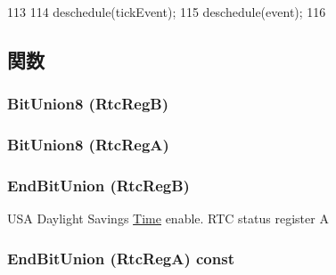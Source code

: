 \begin{DoxyCode}
113 {
114     deschedule(tickEvent);
115     deschedule(event);
116 }
\end{DoxyCode}


\subsection{関数}
\hypertarget{classMC146818_ae9e7ebb8d4dc55d588540f5b369c2bbd}{
\subsubsection[{BitUnion8}]{\setlength{\rightskip}{0pt plus 5cm}BitUnion8 (RtcRegB)}}
\label{classMC146818_ae9e7ebb8d4dc55d588540f5b369c2bbd}
\hypertarget{classMC146818_a374ca70b66d8c7697052fbf0d917c31c}{
\subsubsection[{BitUnion8}]{\setlength{\rightskip}{0pt plus 5cm}BitUnion8 (RtcRegA)}}
\label{classMC146818_a374ca70b66d8c7697052fbf0d917c31c}
\hypertarget{classMC146818_a7efacf2a80b3519649bf9901abe5eaae}{
\subsubsection[{EndBitUnion}]{\setlength{\rightskip}{0pt plus 5cm}EndBitUnion (RtcRegB)}}
\label{classMC146818_a7efacf2a80b3519649bf9901abe5eaae}


USA Daylight Savings \hyperlink{classTime}{Time} enable. RTC status register A \hypertarget{classMC146818_ae44f0fd1a86e3e746e818f5817c33e18}{
\subsubsection[{EndBitUnion}]{\setlength{\rightskip}{0pt plus 5cm}EndBitUnion (RtcRegA) const}}
\label{classMC146818_ae44f0fd1a86e3e746e818f5817c33e18}


